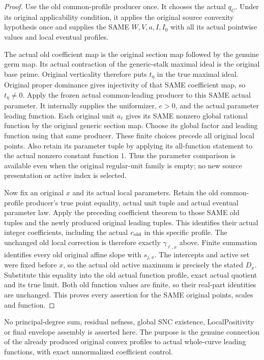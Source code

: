 \begin{proof}
Use the old common-profile producer once. It chooses the actual $q_C$.
Under its original applicability condition, it applies the original
source convexity hypothesis once and supplies the SAME $W,V,a,I,I_0$
with all its actual pointwise values and local eventual profiles.

The actual old coefficient map is the original section map followed by
the genuine germ map. Its actual contraction of the generic-stalk
maximal ideal is the original base prime. Original verticality therefore
puts $t_\eta$ in the true maximal ideal. Original proper dominance gives
injectivity of that SAME coefficient map, so $t_\eta\ne0$.
Apply the frozen actual common-leading producer to this SAME actual
parameter. It internally supplies the uniformizer, $e>0$, and the
actual parameter leading function. Each original unit $a_\ell$ gives
its SAME nonzero global rational function by the original generic
section map. Choose its global factor and leading function using that
same producer. These finite choices precede all original local points.
Also retain its parameter tuple by applying its all-function statement
to the actual nonzero constant function $1$. Thus the parameter comparison
is available even when the original regular-unit family is empty; no
new source presentation or active index is selected.

Now fix an original $x$ and its actual local parameters. Retain the old
common-profile producer's true point equality, actual unit tuple and
actual eventual parameter law. Apply the preceding coefficient theorem
to those SAME old tuples and the newly produced original leading
tuples. This identifies their actual integer coefficients, including
the actual $c_{\rm old}$ in this specific profile. The unchanged old
local correction is therefore exactly $\gamma_{\ell,x}$ above.
Finite summation identifies every old original affine slope with
$s_{j,x}$. The intercepts and active set were fixed before $x$, so the
actual old active maximum is precisely the stated $D_x$.
Substitute this equality into the old actual function profile, exact
actual quotient and its true limit. Both old function values are
finite, so their real-part identities are unchanged. This proves every
assertion for the SAME original points, scales and function.
\end{proof}

No principal-degree sum, residual nefness, global SNC existence,
LocalPositivity or final envelope assembly is asserted here. The
purpose is the genuine connection of the already produced original
convex profiles to actual whole-curve leading functions, with exact
unnormalized coefficient control.
